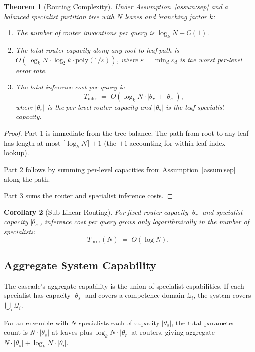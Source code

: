 \documentclass[11pt,a4paper]{article}
\newtheorem{theorem}{Theorem}[section]
\newtheorem{corollary}[theorem]{Corollary}
\theoremstyle{definition}
\theoremstyle{remark}
\begin{document}
\begin{theorem}[Routing Complexity]
\label{thm:route-complexity}
Under Assumption~\ref{assum:sep} and a balanced specialist partition tree with $N$ leaves and branching factor $k$:
\begin{enumerate}
    \item The number of router invocations per query is $\log_k N + O(1)$.
    \item The total router capacity along any root-to-leaf path is $O(\log_k N \cdot \log_2 k \cdot \mathrm{poly}(1/\bar\varepsilon))$, where $\bar\varepsilon = \min_d \varepsilon_d$ is the worst per-level error rate.
    \item The total inference cost per query is
    \[
    T_{\text{infer}} \;=\; O\!\left( \log_k N \cdot |\theta_r| + |\theta_s| \right),
    \]
    where $|\theta_r|$ is the per-level router capacity and $|\theta_s|$ is the leaf specialist capacity.
\end{enumerate}
\end{theorem}

\begin{proof}
Part 1 is immediate from the tree balance. The path from root to any leaf has length at most $\lceil \log_k N \rceil + 1$ (the $+1$ accounting for within-leaf index lookup).

Part 2 follows by summing per-level capacities from Assumption~\ref{assum:sep} along the path.

Part 3 sums the router and specialist inference costs.
\end{proof}

\begin{corollary}[Sub-Linear Routing]
\label{cor:sublinear}
For fixed router capacity $|\theta_r|$ and specialist capacity $|\theta_s|$, inference cost per query grows only logarithmically in the number of specialists:
\[
T_{\text{infer}}(N) \;=\; O(\log N).
\]
\end{corollary}

\subsection{Aggregate System Capability}

The cascade's aggregate capability is the union of specialist capabilities. If each specialist has capacity $|\theta_s|$ and covers a competence domain $\mathcal{Q}_i$, the system covers $\bigcup_i \mathcal{Q}_i$.

For an ensemble with $N$ specialists each of capacity $|\theta_s|$, the total parameter count is $N \cdot |\theta_s|$ at leaves plus $\log_k N \cdot |\theta_r|$ at routers, giving aggregate $N \cdot |\theta_s| + \log_k N \cdot |\theta_r|$.
\end{document}
